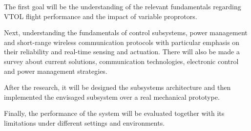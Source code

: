 The first goal will be the understanding of the relevant fundamentals regarding \gls{VTOL} flight performance and the impact of variable proprotors.

Next, understanding the fundamentals of control subsystems, power management and short-range wireless communication protocols with particular emphasis on their reliability and real-time sensing and actuation.
There will also be made a survey about current solutions, communication technologies, electronic control and power management strategies.

After the research, it will be designed the subsystems architecture and then implemented the envisaged subsystem over a real mechanical prototype.

Finally, the performance of the system will be evaluated together with its limitations under different settings and environments.
